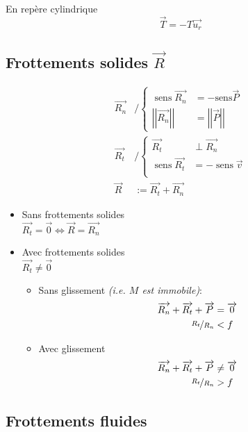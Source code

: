 \documentclass{article}
\renewcommand{\vec}{\overrightarrow}
\begin{document}
En repère cylindrique
\[
	\vec T = -T\vec{u_r}
\] 

\subsection{Frottements solides $\vec R$}

\begin{align*}
	\vec{{{R}_{{n}}}}&\text{/} \begin{cases}
		\operatorname{sens}{\vec{{{R}_{{n}}}}} &= -\text{sens}{\vec{P}} \\
		{\left|{\left|\vec{{{R}_{{n}}}}\right|}\right|} &= {\left|{\left|\vec{{P}}\right|}\right|}
	\end{cases}\\
		\vec{R_t} &\text{/} \begin{cases}
		\vec{R_t} &\perp \vec{R_n} \\
		\operatorname{sens}{\vec{R_t}} &= -\operatorname{sens}{\vec{v}} \\
	\end{cases} \\
	\vec{R} &:= \vec{R_t} + \vec{R_n}
\end{align*}


\begin{itemize}
	\item Sans frottements solides \\
		$\vec{R_t} = \vec{0} \iff \vec{R} = \vec{R_n}$
	\item Avec frottements solides \\
		$\vec{R_t} \neq \vec 0$
		\begin{itemize}
			\item Sans glissement \emph{(i.e. $M$ est immobile)}:
				\begin{align*}
				\vec{R_n} + \vec{R_t} + \vec{P} &= \vec 0 \\
				\nicefrac{R_t}{R_n} &< f
				\end{align*}
			\item Avec glissement
				\begin{align*}
				\vec{R_n} + \vec{R_t} + \vec{P} &\neq \vec 0 \\
				\nicefrac{R_t}{R_n} &> f
				\end{align*}
		\end{itemize}
\end{itemize}

\subsection{Frottements fluides}
\end{document}
